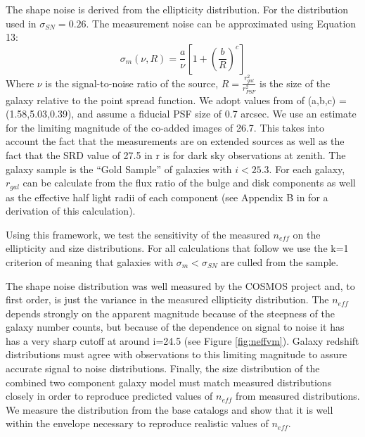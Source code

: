 \documentclass[]{article}
\begin{document}
{The shape noise is derived from the ellipticity distribution.  For the distribution used in \citet{chang} $\sigma_{SN} = 0.26$.
The measurement noise can be approximated using Equation 13:
\begin{equation}
\sigma_m(\nu,R) = \frac{a}{\nu}\left[1+\left(\frac{b}{R}\right)^c\right]
\end{equation}
Where $\nu$ is the signal-to-noise ratio of the source, $R=\frac{r_{gal}^2}{r_{PSF}^2}$ is the size of the galaxy relative to
the point spread function.  We adopt values from \citet{chang} of (a,b,c) = (1.58,5.03,0.39), and assume a fiducial
PSF size of 0.7 arcsec. We use an estimate for the limiting magnitude of the co-added images
of 26.7.  This takes into account the fact that the measurements are on extended sources as well as the fact that the SRD value 
of 27.5 in r is for dark sky observations at zenith.   The galaxy sample is the ``Gold Sample'' of galaxies with $i < 25.3$.
For each galaxy, $r_{gal}$ can be calculate from the flux ratio of the bulge and disk components as well as the effective half light 
radii of each component (see Appendix B in \citet{chang} for a derivation of this calculation).

Using this framework, we test the sensitivity of the measured $n_{eff}$ on the ellipticity and size distributions.  For all calculations that follow we 
use the k=1 criterion of \citet{chang} meaning that galaxies with $\sigma_m < \sigma_{SN}$ are culled from the sample.

The shape noise distribution was well measured by the COSMOS project \citep{cosmos} and, to first order, is just the variance in the measured 
ellipticity distribution.  The $n_{eff}$ depends strongly on the apparent magnitude because of the steepness of the galaxy number
counts, but because of the dependence on signal to noise it has
has a very sharp cutoff at around i=24.5 (see Figure \ref{fig:neffvm}).  Galaxy redshift distributions must
agree with observations to this limiting magnitude to assure accurate signal to noise distributions.  Finally, the size distribution
of the combined two component galaxy model must match measured distributions closely in order to reproduce predicted
values of $n_{eff}$ from measured distributions.  We measure the distribution from the base catalogs and show that it is well
within the envelope necessary to reproduce realistic values of $n_{eff}$.

}
\end{document}
